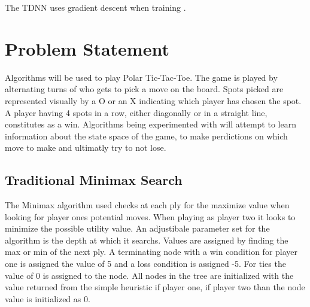 \documentclass[12pt,letterpaper]{article}
\begin{document}
The TDNN uses gradient descent when training \cite{gradientTDNN}.
\cite{stanfordTDNN}
\cite{robotTDNN}


\section{Problem Statement}
Algorithms will be used to play Polar Tic-Tac-Toe. The game is played by alternating turns of who gets to pick a move on the board. Spots picked are represented visually by a O or an X indicating which player has chosen the spot. A player having 4 spots in a row, either diagonally or in a straight line, constitutes as a win. Algorithms being experimented with will attempt to learn information about the state space of the game, to make perdictions on which move to make and ultimatly try to not lose.

\subsection{Traditional Minimax Search}
The Minimax algorithm used checks at each ply for the maximize value when looking for player ones potential moves. When playing as player two it looks to minimize the possible utility value. An adjustibale parameter set for the algorithm is the depth at which it searchs. Values are assigned by finding the max or min of the next ply. A terminating node with a win condition for player one is assigned the value of 5 and a loss condition is assigned -5. For ties the value of 0 is assigned to the node. All nodes in the tree are initialized with the value returned from the simple heuristic if player one, if player two than the node value is initialized as 0. 
\end{document}
